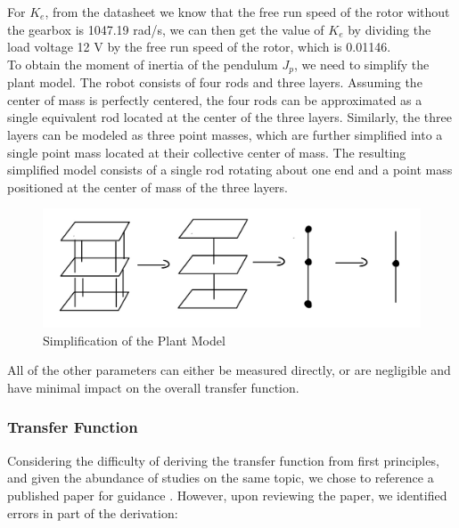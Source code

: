 \documentclass{article}
\begin{document}
For $K_e$, from the datasheet we know that the free run speed of the rotor
without the gearbox is 1047.19 rad/s, we can then get the value of $K_e$ by
dividing the load voltage 12 V by the free run speed of the rotor, which is
0.01146. \\

To obtain the moment of inertia of the pendulum $J_p$, we need to simplify the
plant model. The robot consists of four rods and three layers. Assuming the
center of mass is perfectly centered, the four rods can be approximated as a
single equivalent rod located at the center of the three layers. Similarly, the
three layers can be modeled as three point masses, which are further simplified
into a single point mass located at their collective center of mass. The
resulting simplified model consists of a single rod rotating about one end and a
point mass positioned at the center of mass of the three layers. \\
\begin{figure}[H]
    \centerline{\includegraphics[width=\linewidth]{Figures/plantModelSimplification.png}}
    \caption{Simplification of the Plant Model}
\end{figure}

All of the other parameters can either be measured directly, or are negligible
and have minimal impact on the overall transfer function. \\

\subsubsection{Transfer Function}

Considering the difficulty of deriving the transfer function from first
principles, and given the abundance of studies on the same topic, we chose to
reference a published paper for guidance \cite{suspaper}. However, upon
reviewing the paper, we identified errors in part of the derivation: \\
\end{document}
